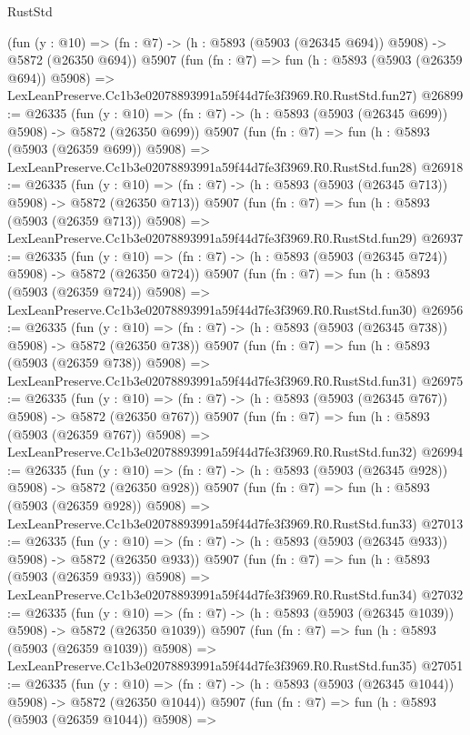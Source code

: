 \begin{lexlean}{RustStd}
\begin{coremodule}
    (fun (y : @10) => (fn : @7) -> (h : @5893 (@5903 (@26345 @694)) @5908) -> @5872 (@26350 @694))
    @5907
    (fun (fn : @7) =>
    fun (h : @5893 (@5903 (@26359 @694)) @5908) =>
    LexLeanPreserve.Cc1b3e02078893991a59f44d7fe3f3969.R0.RustStd.fun27)
@26899 := @26335
    (fun (y : @10) => (fn : @7) -> (h : @5893 (@5903 (@26345 @699)) @5908) -> @5872 (@26350 @699))
    @5907
    (fun (fn : @7) =>
    fun (h : @5893 (@5903 (@26359 @699)) @5908) =>
    LexLeanPreserve.Cc1b3e02078893991a59f44d7fe3f3969.R0.RustStd.fun28)
@26918 := @26335
    (fun (y : @10) => (fn : @7) -> (h : @5893 (@5903 (@26345 @713)) @5908) -> @5872 (@26350 @713))
    @5907
    (fun (fn : @7) =>
    fun (h : @5893 (@5903 (@26359 @713)) @5908) =>
    LexLeanPreserve.Cc1b3e02078893991a59f44d7fe3f3969.R0.RustStd.fun29)
@26937 := @26335
    (fun (y : @10) => (fn : @7) -> (h : @5893 (@5903 (@26345 @724)) @5908) -> @5872 (@26350 @724))
    @5907
    (fun (fn : @7) =>
    fun (h : @5893 (@5903 (@26359 @724)) @5908) =>
    LexLeanPreserve.Cc1b3e02078893991a59f44d7fe3f3969.R0.RustStd.fun30)
@26956 := @26335
    (fun (y : @10) => (fn : @7) -> (h : @5893 (@5903 (@26345 @738)) @5908) -> @5872 (@26350 @738))
    @5907
    (fun (fn : @7) =>
    fun (h : @5893 (@5903 (@26359 @738)) @5908) =>
    LexLeanPreserve.Cc1b3e02078893991a59f44d7fe3f3969.R0.RustStd.fun31)
@26975 := @26335
    (fun (y : @10) => (fn : @7) -> (h : @5893 (@5903 (@26345 @767)) @5908) -> @5872 (@26350 @767))
    @5907
    (fun (fn : @7) =>
    fun (h : @5893 (@5903 (@26359 @767)) @5908) =>
    LexLeanPreserve.Cc1b3e02078893991a59f44d7fe3f3969.R0.RustStd.fun32)
@26994 := @26335
    (fun (y : @10) => (fn : @7) -> (h : @5893 (@5903 (@26345 @928)) @5908) -> @5872 (@26350 @928))
    @5907
    (fun (fn : @7) =>
    fun (h : @5893 (@5903 (@26359 @928)) @5908) =>
    LexLeanPreserve.Cc1b3e02078893991a59f44d7fe3f3969.R0.RustStd.fun33)
@27013 := @26335
    (fun (y : @10) => (fn : @7) -> (h : @5893 (@5903 (@26345 @933)) @5908) -> @5872 (@26350 @933))
    @5907
    (fun (fn : @7) =>
    fun (h : @5893 (@5903 (@26359 @933)) @5908) =>
    LexLeanPreserve.Cc1b3e02078893991a59f44d7fe3f3969.R0.RustStd.fun34)
@27032 := @26335
    (fun (y : @10) => (fn : @7) -> (h : @5893 (@5903 (@26345 @1039)) @5908) -> @5872 (@26350 @1039))
    @5907
    (fun (fn : @7) =>
    fun (h : @5893 (@5903 (@26359 @1039)) @5908) =>
    LexLeanPreserve.Cc1b3e02078893991a59f44d7fe3f3969.R0.RustStd.fun35)
@27051 := @26335
    (fun (y : @10) => (fn : @7) -> (h : @5893 (@5903 (@26345 @1044)) @5908) -> @5872 (@26350 @1044))
    @5907
    (fun (fn : @7) =>
    fun (h : @5893 (@5903 (@26359 @1044)) @5908) =>

\end{coremodule}
\end{lexlean}
